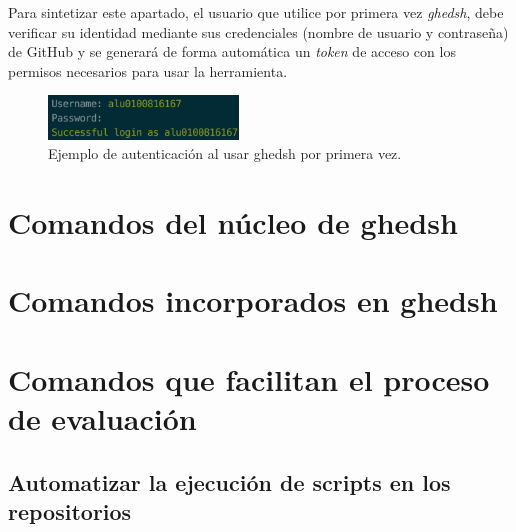 Para sintetizar este apartado, el usuario que utilice por primera vez {\it ghedsh}, debe verificar su identidad mediante sus credenciales (nombre de usuario y contraseña) de GitHub y se
generará de forma automática un {\it token} de acceso con los permisos necesarios para usar la herramienta.

\begin{figure}[H]
	\begin{center}
	\includegraphics[width=0.45\textwidth]{images/login-example}
	\caption{Ejemplo de autenticación al usar ghedsh por primera vez.}
	\label{fig:masterv1}
	\end{center}
\end{figure}

\section{Comandos del núcleo de ghedsh}
\label{3:sec:2}
    
    

\section{Comandos incorporados en ghedsh}
\label{3:sec:3}   
    

\section{Comandos que facilitan el proceso de evaluación}
\label{3:sec:4}  
        	
	
\subsection{Automatizar la ejecución de scripts en los repositorios}
\label{subsec:3.1.3} 
	    
    
		
